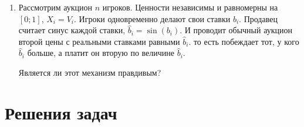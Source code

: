 \begin{enumerate}
\item Рассмотрим аукцион $ n $ игроков. Ценности независимы и равномерны на $ [0;1] $, $ X_{i}=V_{i} $. Игроки одновременно делают свои ставки $ b_{i} $. Продавец считает синус каждой ставки, $ \hat{b}_{i}=\sin (b_{i}) $. И проводит обычный аукцион второй цены с реальными ставками равными $\hat{b}_{i}  $. то есть побеждает тот, у кого $ \hat{b}_{i} $ больше, а платит он вторую по величине $ \hat{b}_{i} $.

Является ли этот механизм правдивым?




\end{enumerate}








\section{Решения задач}
